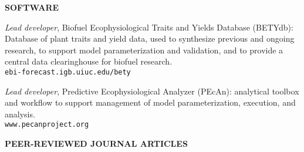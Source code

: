 \documentclass[11pt,twoside]{article}
\begin{document}
\newpage
\textbf{SOFTWARE}
\vspace{-0.5em}
\begin{itemize*}
\item  \emph{Lead developer}, Biofuel Ecophysiological Traits and Yields Database (BETYdb): Database of plant traits and yield data, used to synthesize previous and ongoing research, to support model parameterization and validation, and to provide a central data clearinghouse for biofuel research. \\\texttt{ebi-forecast.igb.uiuc.edu/bety}
\item  \emph{Lead developer}, Predictive Ecophysiological Analyzer (PEcAn): analytical toolbox and workflow to support management of model parameterization, execution, and analysis.  \\\texttt{www.pecanproject.org}
\end{itemize*}
\textbf{PEER-REVIEWED JOURNAL ARTICLES}
\vspace{-0.5em}
\end{document}
